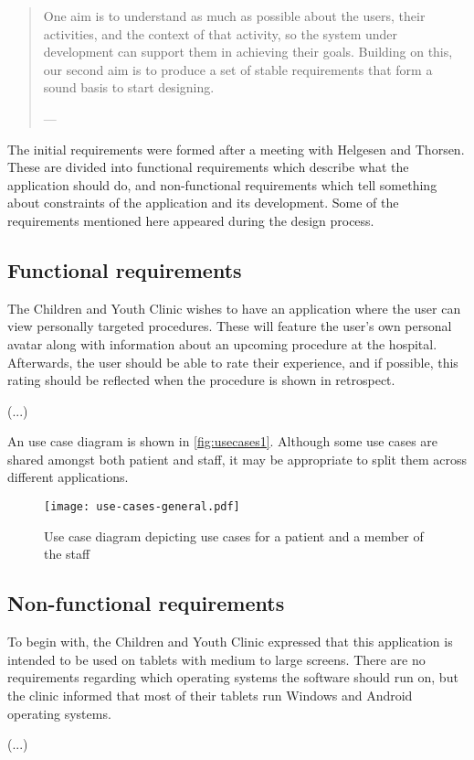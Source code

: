 \begin{quote}
    One aim is to understand as much as possible about the users, their activities, and the context of that activity, so the system under development can support them in achieving their goals. Building on this, our second aim is to produce a set of stable requirements that form a sound basis to start designing.

    \raggedleft--- \textcite{preece2015}
\end{quote}

The initial requirements were formed after a meeting with Helgesen and Thorsen. These are divided into functional requirements which describe what the application should do, and non-functional requirements which tell something about constraints of the application and its development. Some of the requirements mentioned here appeared during the design process.

\subsection{Functional requirements}

The Children and Youth Clinic wishes to have an application where the user can view personally targeted procedures. These will feature the user's own personal avatar along with information about an upcoming procedure at the hospital. Afterwards, the user should be able to rate their experience, and if possible, this rating should be reflected when the procedure is shown in retrospect.

(...)

An use case diagram is shown in \autoref{fig:usecases1}. Although some use cases are shared amongst both patient and staff, it may be appropriate to split them across different applications.

\begin{figure}
    \centering
    \texttt{[image: use-cases-general.pdf]}
    \caption{Use case diagram depicting use cases for a patient and a member of the staff}
    \label{fig:usecases1}
\end{figure}

\subsection{Non-functional requirements}

To begin with, the Children and Youth Clinic expressed that this application is intended to be used on tablets with medium to large screens. There are no requirements regarding which operating systems the software should run on, but the clinic informed that most of their tablets run Windows and Android operating systems.

(...)

